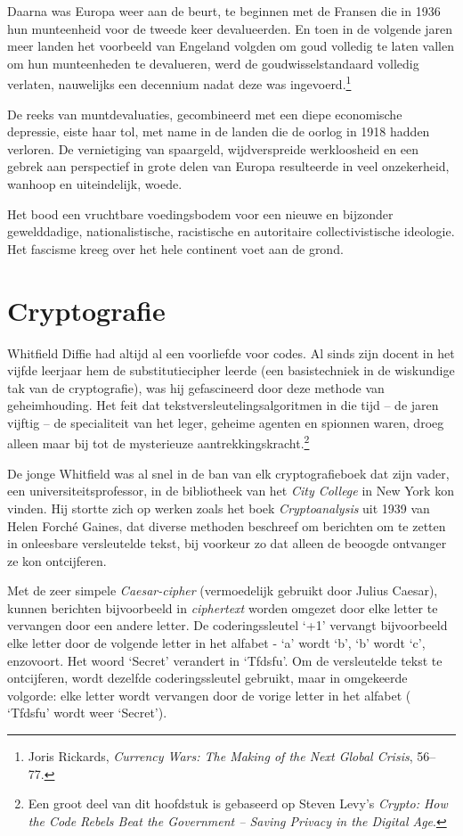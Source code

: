 \documentclass[
  a5paper,
  smalldemyvopaper,11pt,twoside,onecolumn,openright,extrafontsizes,
hidelinks]{memoir}
\begin{document}
Daarna was Europa weer aan de beurt, te beginnen met de Fransen die in
1936 hun munteenheid voor de tweede keer devalueerden. En toen in de
volgende jaren meer landen het voorbeeld van Engeland volgden om goud
volledig te laten vallen om hun munteenheden te devalueren, werd de
goudwisselstandaard volledig verlaten, nauwelijks een decennium nadat
deze was ingevoerd.\footnote{\hspace{0pt}Joris Rickards, \emph{Currency
  Wars: The Making of the Next Global Crisis}, 56--77.}

De reeks van muntdevaluaties, gecombineerd met een diepe economische
depressie, eiste haar tol, met name in de landen die de oorlog in 1918
hadden verloren. De vernietiging van spaargeld, wijdverspreide
werkloosheid en een gebrek aan perspectief in grote delen van Europa
resulteerde in veel onzekerheid, wanhoop en uiteindelijk, woede.

Het bood een vruchtbare voedingsbodem voor een nieuwe en bijzonder
gewelddadige, nationalistische, racistische en autoritaire
collectivistische ideologie. Het fascisme kreeg over het hele continent
voet aan de grond.

\chapter{Cryptografie}\label{cryptografie}

Whitfield Diffie had altijd al een voorliefde voor codes. Al sinds zijn
docent in het vijfde leerjaar hem de substitutiecipher leerde (een
basistechniek in de wiskundige tak van de cryptografie), was hij
gefascineerd door deze methode van geheimhouding. Het feit dat
tekstversleutelingsalgoritmen in die tijd -- de jaren vijftig -- de
specialiteit van het leger, geheime agenten en spionnen waren, droeg
alleen maar bij tot de mysterieuze aantrekkingskracht.\footnote{Een
  groot deel van dit hoofdstuk is gebaseerd op Steven Levy's
  \emph{Crypto: How the Code Rebels Beat the Government -- Saving
  Privacy in the Digital Age}.}

De jonge Whitfield was al snel in de ban van elk cryptografieboek dat
zijn vader, een universiteitsprofessor, in de bibliotheek van het
\emph{City College} in New York kon vinden. Hij stortte zich op werken
zoals het boek \emph{Cryptoanalysis} uit 1939 van Helen Forché Gaines,
dat diverse methoden beschreef om berichten om te zetten in onleesbare
versleutelde tekst, bij voorkeur zo dat alleen de beoogde ontvanger ze
kon ontcijferen.

Met de zeer simpele \emph{Caesar-cipher} (vermoedelijk gebruikt door
Julius Caesar), kunnen berichten bijvoorbeeld in \emph{ciphertext}
worden omgezet door elke letter te vervangen door een andere letter. De
coderingssleutel `+1' vervangt bijvoorbeeld elke letter door de volgende
letter in het alfabet - `a' wordt `b', `b' wordt `c', enzovoort. Het
woord `Secret' verandert in `Tfdsfu'. Om de versleutelde tekst te
ontcijferen, wordt dezelfde coderingssleutel gebruikt, maar in
omgekeerde volgorde: elke letter wordt vervangen door de vorige letter
in het alfabet ( `Tfdsfu' wordt weer `Secret').
\end{document}
